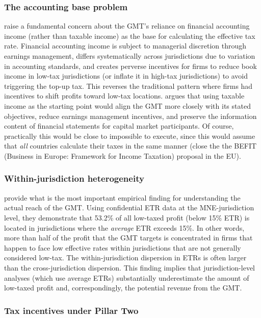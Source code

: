 \documentclass[11pt,a4paper]{article}
\begin{document}
\subsubsection{The accounting base problem}

\citet{hanlon2023} raise a fundamental concern about the GMT's reliance on financial accounting income (rather than taxable income) as the base for calculating the effective tax rate. Financial accounting income is subject to managerial discretion through earnings management, differs systematically across jurisdictions due to variation in accounting standards, and creates perverse incentives for firms to reduce book income in low-tax jurisdictions (or inflate it in high-tax jurisdictions) to avoid triggering the top-up tax. This reverses the traditional pattern where firms had incentives to shift profits toward low-tax locations. \citeauthor{hanlon2023} argues that using taxable income as the starting point would align the GMT more closely with its stated objectives, reduce earnings management incentives, and preserve the information content of financial statements for capital market participants. Of course, practically this would be close to impossible to execute, since this would assume that \emph{all} countries calculate their taxes in the same manner (close the the BEFIT (Business in Europe: Framework for Income Taxation) proposal in the EU).

\subsubsection{Within-jurisdiction heterogeneity}

\citet{hugger2025} provide what is the most important empirical finding for understanding the actual reach of the GMT. Using confidential ETR data at the MNE-jurisdiction level, they demonstrate that 53.2\% of all low-taxed profit (below 15\% ETR) is located in jurisdictions where the \textit{average} ETR exceeds 15\%. In other words, more than half of the profit that the GMT targets is concentrated in firms that happen to face low effective rates within jurisdictions that are not generally considered low-tax. The within-jurisdiction dispersion in ETRs is often larger than the cross-jurisdiction dispersion. This finding implies that jurisdiction-level analyses (which use average ETRs) substantially underestimate the amount of low-taxed profit and, correspondingly, the potential revenue from the GMT.

\subsubsection{Tax incentives under Pillar Two}
\end{document}
